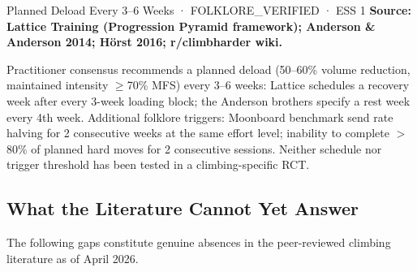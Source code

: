 \begin{folklorebox}{Planned Deload Every 3--6 Weeks · FOLKLORE\_VERIFIED · ESS 1}
\textbf{Source: Lattice Training (Progression Pyramid framework); Anderson \& Anderson 2014; Hörst 2016; r/climbharder wiki.}

Practitioner consensus recommends a planned deload (50–60\% volume reduction, maintained intensity $\geq$70\% MFS) every 3–6 weeks: Lattice schedules a recovery week after every 3-week loading block; the Anderson brothers specify a rest week every 4th week. Additional folklore triggers: Moonboard benchmark send rate halving for 2 consecutive weeks at the same effort level; inability to complete $>$80\% of planned hard moves for 2 consecutive sessions. Neither schedule nor trigger threshold has been tested in a climbing-specific RCT.
\end{folklorebox}

\subsection{What the Literature Cannot Yet Answer}
\label{subsec:open_questions}

The following gaps constitute genuine absences in the peer-reviewed climbing literature as of April 2026.

